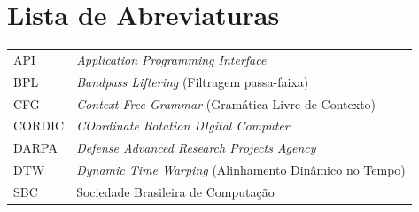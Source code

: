 \documentclass[portuguese,12pt,oneside,a4paper]{book}
\begin{document}
\chapter{Lista de Abreviaturas}
\begin{tabular}{ll}
	API 	& \textit{Application Programming Interface} \\
    BPL		& \textit{Bandpass Liftering} (Filtragem passa-faixa)\\
	CFG 	& \textit{Context-Free Grammar} (Gramática Livre de Contexto)\\
	CORDIC  & \textit{COordinate Rotation DIgital Computer} \\
	DARPA	& \textit{Defense Advanced Research Projects Agency}\\
	DTW 	& \textit{Dynamic Time Warping} (Alinhamento Dinâmico no Tempo)\\
	SBC 	& Sociedade Brasileira de Computação\\

\end{tabular}



\listoffigures            
\listoftables            


\mainmatter

\fancyhead[RE,LO]{\thesection}

\onehalfspacing            %





\appendix
\renewcommand{\appendixname}{Apêndice} %
\setcounter{chapter}{0} %




\backmatter \singlespacing   %
\end{document}
